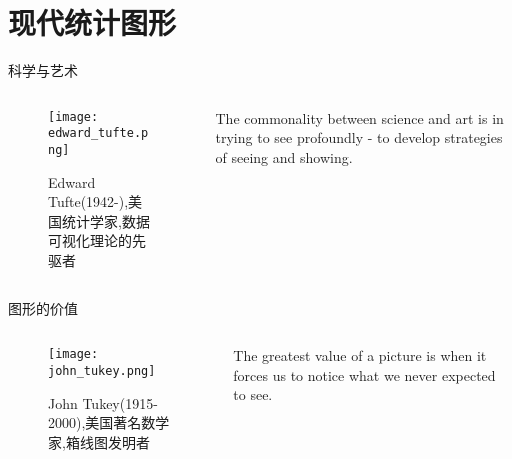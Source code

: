 
 \section{现代统计图形}

\begin{frame}{科学与艺术}
  \begin{columns}
    \begin{column}{.4\textwidth}
      \begin{figure}
        \centering \texttt{[image: edward\_tufte.png]}
        \caption{\scriptsize Edward Tufte(1942-),美国统计学家,数据可视化理论的先驱者}
      \end{figure}
    \end{column}

    \begin{column}{.6\textwidth}
  \begin{ornamentblock}
    {The commonality between science and art is in trying to see profoundly - to develop strategies of seeing and showing.\\
      }
  \end{ornamentblock}
    \end{column}
  \end{columns}
\end{frame}

\begin{frame}{图形的价值}
  \begin{columns}
    \begin{column}{.3\textwidth}
      \begin{figure}
        \centering \texttt{[image: john\_tukey.png]}
        \caption{\scriptsize John Tukey(1915-2000),美国著名数学家,箱线图发明者}
      \end{figure}
    \end{column}

    \begin{column}{.7\textwidth}
  \begin{ornamentblock}
    {The greatest value of a picture is when it forces us to notice what we never expected to see.\\
      }
  \end{ornamentblock}
    \end{column}
  \end{columns}
\end{frame}



